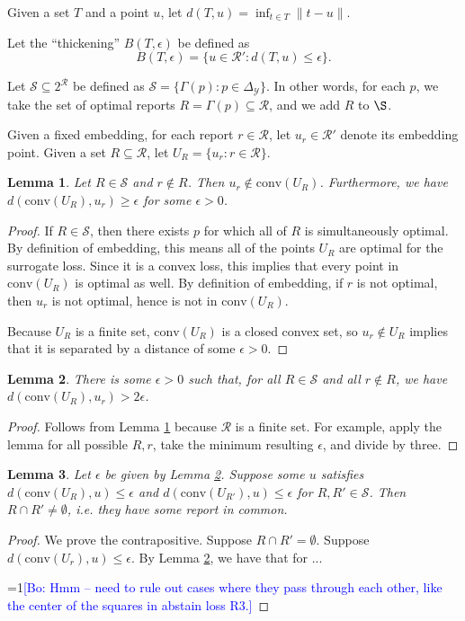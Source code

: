 \documentclass{article}
\newcommand{\Comments}{1}
\newcommand{\mynote}[2]{\ifnum\Comments=1\textcolor{#1}{#2}\fi}
\newcommand{\bo}[1]{\mynote{blue}{[Bo: #1]}}
\newcommand{\R}{\mathcal{R}}
\newcommand{\Y}{\mathcal{Y}}
\newcommand{\conv}{\mathrm{conv}}
\newtheorem{lemma}{Lemma}
\begin{document}
Given a set $T$ and a point $u$, let $d(T,u) = \inf_{t \in T} \|t-u\|$.

Let the ``thickening'' $B(T,\epsilon)$ be defined as
  \[ B(T,\epsilon) = \{u \in \R' : d(T,u) \leq \epsilon \} . \]

Let $\mathcal{S} \subseteq 2^{\R}$ be defined as $\mathcal{S} = \{\Gamma(p) : p \in \Delta_{\Y}\}$.
In other words, for each $p$, we take the set of optimal reports $R = \Gamma(p) \subseteq \R$, and we add $R$ to $\S$.

Given a fixed embedding, for each report $r \in \R$, let $u_r \in \R'$ denote its embedding point.
Given a set $R \subseteq \R$, let $U_R = \{u_r : r \in \R\}$.

\begin{lemma} \label{lemma:conv-R-no-contain}
  Let $R \in \mathcal{S}$ and $r \not\in R$.
  Then $u_r \not\in \conv(U_R)$.
  Furthermore, we have $d(\conv(U_R), u_r) \geq \epsilon$ for some $\epsilon > 0$.
\end{lemma}
\begin{proof}
  If $R \in \mathcal{S}$, then there exists $p$ for which all of $R$ is simultaneously optimal.
  By definition of embedding, this means all of the points $U_R$ are optimal for the surrogate loss.
  Since it is a convex loss, this implies that every point in $\conv(U_R)$ is optimal as well.
  By definition of embedding, if $r$ is not optimal, then $u_r$ is not optimal, hence is not in $\conv(U_R)$.

  Because $U_R$ is a finite set, $\conv(U_R)$ is a closed convex set, so $u_r \not\in U_R$ implies that it is separated by a distance of some $\epsilon > 0$.
\end{proof}

\begin{lemma} \label{lemma:conv-R-min-eps}
  There is some $\epsilon > 0$ such that, for all $R \in \mathcal{S}$ and all $r \not\in R$, we have $d(\conv(U_R), u_r) > 2\epsilon$.
\end{lemma}
\begin{proof}
  Follows from Lemma \ref{lemma:conv-R-no-contain} because $\R$ is a finite set. For example, apply the lemma for all possible $R,r$, take the minimum resulting $\epsilon$, and divide by three.
\end{proof}

\begin{lemma} \label{lemma:U-close-intersect}
  Let $\epsilon$ be given by Lemma \ref{lemma:conv-R-min-eps}.
  Suppose some $u$ satisfies $d(\conv(U_R),u) \leq \epsilon$ and $d(\conv(U_{R'}),u) \leq \epsilon$ for $R,R' \in \mathcal{S}$.
  Then $R \cap R' \neq \emptyset$, i.e. they have some report in common.
\end{lemma}
\begin{proof}
  We prove the contrapositive.
  Suppose $R \cap R' = \emptyset$.
  Suppose $d(\conv(U_r),u) \leq \epsilon$.
  By Lemma \ref{lemma:conv-R-min-eps}, we have that for ...

  \bo{Hmm -- need to rule out cases where they pass through each other, like the center of the squares in abstain loss R3.}
\end{proof}
\end{document}
